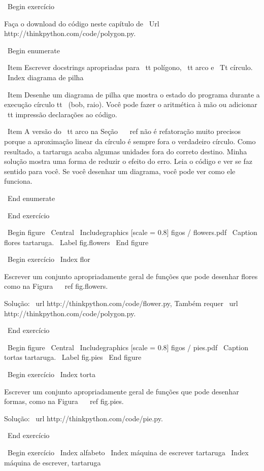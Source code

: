 \documentclass[10pt]{book}
\begin{document}
{\ Begin {} exercício

Faça o download do código neste capítulo de
\ Url {http://thinkpython.com/code/polygon.py}.

\ Begin {enumerate}

\ Item Escrever docstrings apropriadas para {\ tt polígono}, {\ tt arco} e
{\ Tt círculo}.
\ Index {diagrama de pilha}

\ Item Desenhe um diagrama de pilha que mostra o estado do programa
durante a execução {círculo tt \ (bob, raio)}. Você pode fazer o
aritmética à mão ou adicionar {\ tt impressão} declarações ao código.

\ Item A versão do {\ tt arco} na Seção ~ \ ref {} não é refatoração
muito precisos porque a aproximação linear da
círculo é sempre fora o verdadeiro círculo. Como resultado,
a tartaruga acaba algumas unidades fora do correto
destino. Minha solução mostra uma forma de reduzir
o efeito do erro. Leia o código e ver se faz
sentido para você. Se você desenhar um diagrama, você pode ver como ele funciona.

\ End {enumerate}

\ End {} exercício

\ Begin {figure}
\ Central
{\ Includegraphics [scale = 0.8] {figos / flowers.pdf}}
\ Caption {flores tartaruga.}
\ Label {} fig.flowers
\ End {figure}

\ Begin {} exercício
\ Index {flor}

Escrever um conjunto apropriadamente geral de funções que
pode desenhar flores como na Figura ~ \ ref {} fig.flowers.

Solução: \ url {http://thinkpython.com/code/flower.py},
Também requer \ url {http://thinkpython.com/code/polygon.py}.

\ End {} exercício

\ Begin {figure}
\ Central
{\ Includegraphics [scale = 0.8] {figos / pies.pdf}}
\ Caption {tortas tartaruga.}
\ Label {} fig.pies
\ End {figure}


\ Begin {} exercício
\ Index {torta}

Escrever um conjunto apropriadamente geral de funções que
pode desenhar formas, como na Figura ~ \ ref {} fig.pies.

Solução: \ url {http://thinkpython.com/code/pie.py}.

\ End {} exercício

\ Begin {} exercício
\ Index {alfabeto}
\ Index {máquina de escrever tartaruga}
\ Index {máquina de escrever, tartaruga}

}
\end{document}
